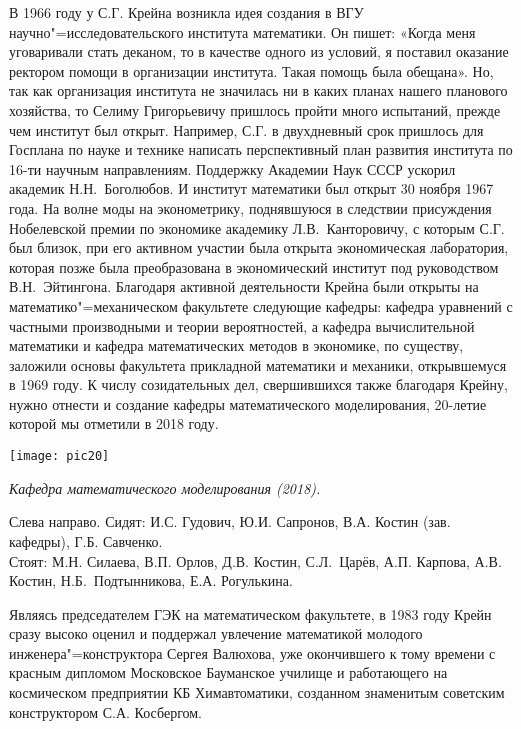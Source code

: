 В 1966 году у С.Г. Крейна возникла идея создания в ВГУ научно"=исследовательского института математики. Он пишет: «Когда меня уговаривали стать деканом, то в качестве одного из условий, я поставил оказание ректором помощи в организации института. Такая помощь была обещана». Но, так как организация института не значилась ни в каких планах нашего планового хозяйства, то Селиму Григорьевичу пришлось пройти много испытаний, прежде чем институт был открыт. Например, С.Г. в двухдневный срок пришлось для Госплана по науке и технике написать перспективный план развития института по 16-ти научным направлениям. Поддержку Академии Наук СССР ускорил академик Н.Н.~Боголюбов. И институт математики был открыт 30      ноября 1967 года.
На волне моды на эконометрику, поднявшуюся в следствии присуждения Нобелевской премии по экономике академику Л.В.~Канторовичу, с которым С.Г. был близок, при его активном участии была открыта экономическая лаборатория, которая позже была преобразована в экономический институт под руководством В.Н.~Эйтингона. Благодаря активной деятельности Крейна были открыты на математико"=механическом факультете следующие кафедры: кафедра уравнений с частными производными и теории вероятностей, а кафедра вычислительной математики и кафедра математических методов в экономике, по существу, заложили основы факультета прикладной математики и механики, открывшемуся в 1969 году.
К числу созидательных дел, свершившихся также благодаря Крейну, нужно отнести и создание кафедры математического моделирования, 20-летие которой мы отметили в 2018 году.


\begin{center}

\texttt{[image: pic20]}


{\it Кафедра математического моделирования (2018).

Слева направо. Сидят: И.С. Гудович, Ю.И. Сапронов, В.А. Костин (зав. кафедры), Г.Б. Савченко.\\ Стоят: М.Н. Силаева, В.П. Орлов, Д.В. Костин, С.Л.~Царёв, А.П. Карпова, А.В. Костин, Н.Б.~Подтынникова, Е.А. Рогулькина.
}
\end{center}

Являясь председателем ГЭК на математическом факультете, в 1983 году Крейн сразу высоко оценил и поддержал увлечение математикой молодого инженера"=конструктора Сергея Валюхова, уже окончившего к тому времени с красным дипломом Московское Бауманское училище и работающего на космическом предприятии КБ Химавтоматики, созданном знаменитым советским конструктором С.А. Косбергом.


